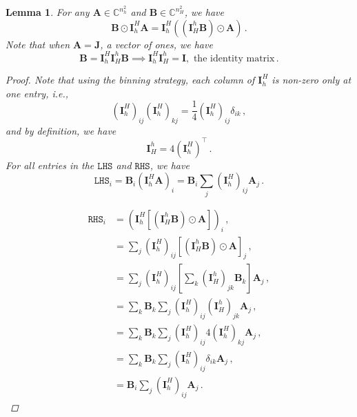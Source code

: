 \documentclass[10pt,a4paper]{amsart}
\newtheorem{lemma}{Lemma}
\begin{document}
\begin{lemma}\label{lem:commutative}
For any $\bm{A}\in\mathbb{C}^{n_h^2}$ and $\bm{B}\in\mathbb{C}^{n_H^2}$, we have
    \begin{equation*}
        \bm{B}\odot \bm{I}_h^H\bm{A} = \bm{I}_h^H((\bm{I}_H^h\bm{B})\odot\bm{A})\,.
    \end{equation*}
Note that when $\bm{A}=\bm{J}$, a vector of ones, we have 
\begin{equation*}
    \bm{B} = \bm{I}_h^H\bm{I}_H^h\bm{B}\implies \bm{I}_h^H\bm{I}_H^h = \bm{I},\text{ the identity matrix}\,.
\end{equation*}

    \begin{proof}
    Note that using the binning strategy, each column of $\bm{I}_h^H$ is non-zero only at one entry, i.e.,
  \begin{equation*}
    (\bm{I}_h^H)_{ij}(\bm{I}_h^H)_{kj} = \frac{1}{4}(\bm{I}_h^H)_{ij}\delta_{ik}\,,
  \end{equation*}
  and by definition, we have
  \begin{equation*}
      \bm{I}_H^h = 4(\bm{I}_h^H)^\top\,.
  \end{equation*}
    For all entries in the $\texttt{LHS}$ and $\texttt{RHS}$, we have 
    \begin{equation*}
            \texttt{LHS}_i = \bm{B}_i(\bm{I}_h^H\bm{A})_i = \bm{B}_i\sum_{j}(\bm{I}_h^H)_{ij}\bm{A}_j\,.
    \end{equation*}
    \item 
    \begin{equation*}
        \begin{aligned}
            \texttt{RHS}_i &= (\bm{I}_h^H[(\bm{I}_H^h\bm{B})\odot\bm{A}])_i\,,\\
            &= \sum_{j}(\bm{I}_h^H)_{ij}[(\bm{I}_H^h\bm{B})\odot\bm{A}]_j\,,\\
            &= \sum_{j}(\bm{I}_h^H)_{ij}\left[\sum_{k}(\bm{I}_H^h)_{jk}\bm{B}_k\right]\bm{A}_j\,,\\
            &= \sum_{k}\bm{B}_k\sum_{j}(\bm{I}_h^H)_{ij}(\bm{I}_H^h)_{jk}\bm{A}_j\,,\\
            &= \sum_{k}\bm{B}_k\sum_{j}(\bm{I}_h^H)_{ij}4(\bm{I}_h^H)_{kj}\bm{A}_j\,,\\
             &= \sum_{k}\bm{B}_k\sum_{j}(\bm{I}_h^H)_{ij}\delta_{ik}\bm{A}_j\,,\\
             &= \bm{B}_i\sum_{j}(\bm{I}_h^H)_{ij}\bm{A}_j\,.
        \end{aligned}
    \end{equation*}
    \end{proof}
\end{lemma}
\end{document}
